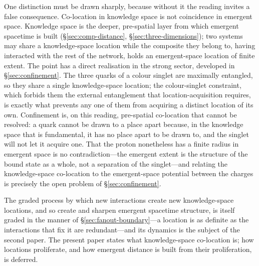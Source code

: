 One distinction must be drawn sharply, because without it the reading invites a
false consequence. Co-location in knowledge space is not coincidence in emergent
space. Knowledge space is the deeper, pre-spatial layer from which emergent
spacetime is built (\S\ref{sec:comp-distance}, \S\ref{sec:three-dimensions}); two
systems may share a knowledge-space location while the composite they belong to,
having interacted with the rest of the network, holds an emergent-space location
of finite extent. The point has a direct realisation in the strong sector,
developed in \S\ref{sec:confinement}. The three quarks of a colour singlet are
maximally entangled, so they share a single knowledge-space location; the
colour-singlet constraint, which forbids them the external entanglement that
location-acquisition requires, is exactly what prevents any one of them from
acquiring a distinct location of its own. Confinement is, on this reading,
pre-spatial co-location that cannot be resolved: a quark cannot be drawn to a
place apart because, in the knowledge space that is fundamental, it has no place
apart to be drawn to, and the singlet will not let it acquire one. That the proton
nonetheless has a finite radius in emergent space is no contradiction---the
emergent extent is the structure of the bound state as a whole, not a separation
of the singlet---and relating the knowledge-space co-location to the
emergent-space potential between the charges is precisely the open problem of
\S\ref{sec:confinement}.

The graded process by which new interactions create new knowledge-space locations,
and so create and sharpen emergent spacetime structure, is itself graded in the
manner of \S\ref{sec:fanout-boundary}---a location is as definite as the
interactions that fix it are redundant---and its dynamics is the subject of the
second paper. The present paper states what knowledge-space co-location is; how
locations proliferate, and how emergent distance is built from their proliferation,
is deferred.
